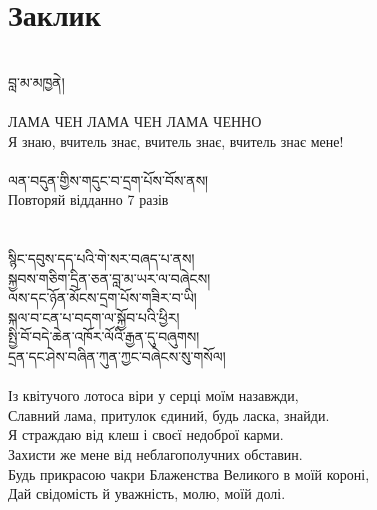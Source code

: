 \section{Заклик}
\\
\ti
བླ་མ་མཁྱནེ།\\
\\
\ru
ЛАМА ЧЕН ЛАМА ЧЕН ЛАМА ЧЕННО\\
Я знаю, вчитель знає, вчитель знає, вчитель знає мене!\\
\\
\scriptsize \ti
ལན་བདུན་གྱིས་གདུང་བ་དྲག་པོས་བོས་ནས།\\
\ru
Повторяй відданно 7 разів\\
\\
\\
\normalsize
\ti
སྙིང་དབུས་དད་པའི་གེ་སར་བཞད་པ་ནས།\\
སྐྱབས་གཅིག་དྲིན་ཅན་བླ་མ་ཡར་ལ་བཞེངས།\\
ལས་དང་ཉོན་མོངས་དྲག་པོས་གཟིར་བ་ཡི།\\
སྐལ་བ་ངན་པ་བདག་ལ་སྐྱོབ་པའི་ཕྱིར།\\
སྤྱི་བོ་བདེ་ཆེན་འཁོར་ལོའི་རྒྱན་དུ་བཞུགས།\\
དྲན་དང་ཤེས་བཞིན་ཀུན་ཀྱང་བཞེངས་སུ་གསོལ།\\
\\
\ru
Із квітучого лотоса віри у серці моїм назавжди, \\
Славний лама, притулок єдиний, будь ласка, знайди.\\
Я страждаю від клеш і своєї недоброї карми.\\
Захисти же мене від неблагополучних обставин.\\
Будь прикрасою чакри Блаженства Великого в моїй короні,\\
Дай свідомість й уважність, молю, моїй долі.\\
\\
